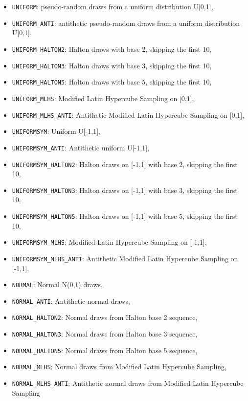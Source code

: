 \documentclass[12pt,a4paper]{article}
\begin{document}
\begin{itemize}
 \item \lstinline$UNIFORM$: pseudo-random draws from a uniform distribution
 U[0,1],
 \item \lstinline$UNIFORM_ANTI$: antithetic pseudo-random draws from a uniform distribution U[0,1],
 \item \lstinline$UNIFORM_HALTON2$: Halton draws with base 2, skipping the first 10,
 \item \lstinline$UNIFORM_HALTON3$: Halton draws with base 3, skipping the first 10,
 \item \lstinline$UNIFORM_HALTON5$: Halton draws with base 5, skipping the first 10,
 \item \lstinline$UNIFORM_MLHS$: Modified Latin Hypercube Sampling on [0,1],
 \item \lstinline$UNIFORM_MLHS_ANTI$: Antithetic Modified Latin Hypercube Sampling on [0,1],
 \item \lstinline$UNIFORMSYM$: Uniform U[-1,1],
 \item \lstinline$UNIFORMSYM_ANTI$: Antithetic uniform U[-1,1],
 \item \lstinline$UNIFORMSYM_HALTON2$: Halton draws on [-1,1] with base 2, skipping the first 10,
 \item \lstinline$UNIFORMSYM_HALTON3$: Halton draws on [-1,1] with base 3, skipping the first 10,
 \item \lstinline$UNIFORMSYM_HALTON5$: Halton draws on [-1,1] with base 5, skipping the first 10,
 \item \lstinline$UNIFORMSYM_MLHS$: Modified Latin Hypercube Sampling on [-1,1],
 \item \lstinline$UNIFORMSYM_MLHS_ANTI$: Antithetic Modified Latin Hypercube Sampling on [-1,1],
 \item \lstinline$NORMAL$: Normal N(0,1) draws,
 \item \lstinline$NORMAL_ANTI$: Antithetic normal draws,
 \item \lstinline$NORMAL_HALTON2$: Normal draws from Halton base 2 sequence,
 \item \lstinline$NORMAL_HALTON3$: Normal draws from Halton base 3 sequence,
 \item \lstinline$NORMAL_HALTON5$: Normal draws from Halton base 5 sequence,
 \item \lstinline$NORMAL_MLHS$: Normal draws from Modified Latin Hypercube Sampling,
 \item \lstinline$NORMAL_MLHS_ANTI$: Antithetic normal draws from Modified
 Latin Hypercube Sampling
\end{itemize}
\end{document}
